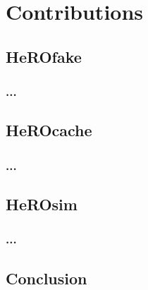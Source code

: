 \chapter{Contributions}

\section{HeROfake}

\subsection{...}

\section{HeROcache}

\subsection{...}

\section{HeROsim}

\subsection{...}

\section{Conclusion}
